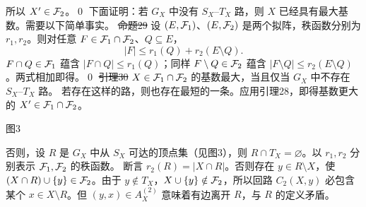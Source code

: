 所以 $X'\in\mathcal F_2$。\qed
下面证明：若 $G_X$ 中没有 $S_X$--$T_X$ 路，则 $X$ 已经具有最大基数。需要以下简单事实。
\st{命题29} 设 $(E,\mathcal F_1)$、$(E,\mathcal F_2)$ 是两个拟阵，秩函数分别为 $r_1,r_2$。则对任意 $F\in\mathcal F_1\cap\mathcal F_2$、$Q\subseteq E$，
\[|F|\le r_1(Q)+r_2(E\setminus Q).\]
\pr $F\cap Q\in\mathcal F_1$ 蕴含 $|F\cap Q|\le r_1(Q)$；同样 $F\setminus Q\in\mathcal F_2$ 蕴含 $|F\setminus Q|\le r_2(E\setminus Q)$。两式相加即得。\qed
\st{引理30} $X\in\mathcal F_1\cap\mathcal F_2$ 的基数最大，当且仅当 $G_X$ 中不存在 $S_X$--$T_X$ 路。
\pr 若存在这样的路，则也存在最短的一条。应用引理28，即得基数更大的 $X'\in\mathcal F_1\cap\mathcal F_2$。
\begin{center}
\par\small 图3
\end{center}
否则，设 $R$ 是 $G_X$ 中从 $S_X$ 可达的顶点集（见图3），则 $R\cap T_X=\varnothing$。以 $r_1,r_2$ 分别表示 $\mathcal F_1,\mathcal F_2$ 的秩函数。
断言 $r_2(R)=|X\cap R|$。否则存在 $y\in R\setminus X$，使 $(X\cap R)\cup\{y\}\in\mathcal F_2$。由于 $y\notin T_X$，$X\cup\{y\}\notin\mathcal F_2$，所以回路 $C_2(X,y)$ 必包含某个 $x\in X\setminus R$。但 $(y,x)\in A_X^{(2)}$ 意味着有边离开 $R$，与 $R$ 的定义矛盾。

